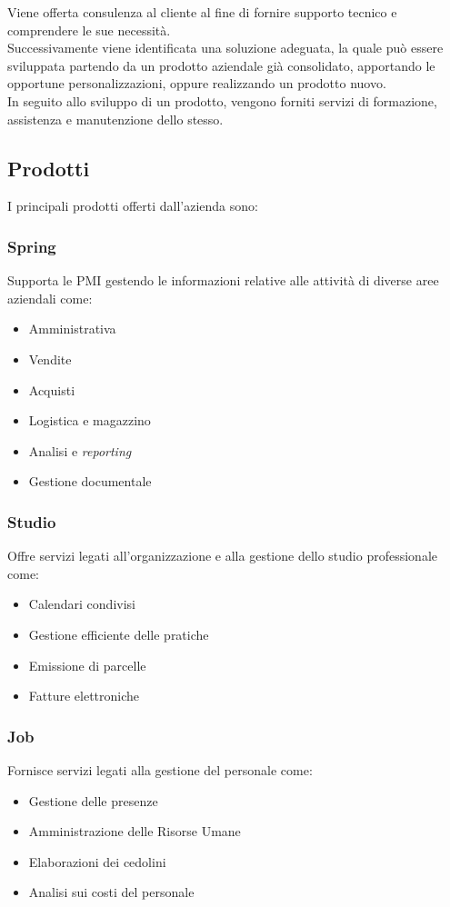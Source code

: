 Viene offerta consulenza al cliente al fine di fornire supporto tecnico e comprendere le sue necessità.\\
Successivamente viene identificata una soluzione adeguata, la quale può essere sviluppata partendo da un prodotto aziendale già consolidato, apportando le opportune personalizzazioni, oppure realizzando un prodotto nuovo.\\
In seguito allo sviluppo di un prodotto, vengono forniti servizi di formazione, assistenza e manutenzione dello stesso.\\

\subsection{Prodotti}
I principali prodotti offerti dall'azienda sono: 

\subsubsection*{Spring}
Supporta le \gls{PMI} gestendo le informazioni relative alle attività di diverse aree aziendali come: 

\begin{itemize}
    \item Amministrativa 
    \item Vendite 
    \item Acquisti 
    \item Logistica e magazzino
    \item Analisi e \emph{reporting}
    \item Gestione documentale
\end{itemize}

\subsubsection*{Studio}
Offre servizi legati all'organizzazione e alla gestione dello studio professionale come:
\begin{itemize}
    \item Calendari condivisi  
    \item Gestione efficiente delle pratiche 
    \item Emissione di parcelle  
    \item Fatture elettroniche 
\end{itemize}

\subsubsection*{Job}
Fornisce servizi legati alla gestione del personale come: 
\begin{itemize}
    \item Gestione delle presenze  
    \item Amministrazione delle Risorse Umane  
    \item Elaborazioni dei cedolini 
    \item Analisi sui costi del personale
\end{itemize}

